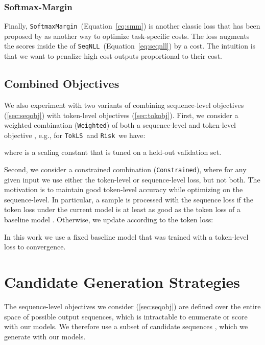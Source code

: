 \documentclass[11pt,a4paper]{article}
\newcommand{\TokLS}{\texttt{TokLS}}
\newcommand{\SeqNLL}{\texttt{SeqNLL}}
\newcommand{\Risk}{\texttt{Risk}}
\newcommand{\SoftmaxMargin}{\texttt{SoftmaxMargin}}
\newcommand{\Constrained}{\texttt{Constrained}}
\newcommand{\Weighted}{\texttt{Weighted}}
\begin{document}
\subsubsection*{Softmax-Margin}
\label{sec:smm}

Finally, \SoftmaxMargin~(Equation~\ref{eq:smm}) is another classic loss that has been proposed by \citet{gimpel+smith2010acl} as another way to optimize task-specific costs.
The loss augments the scores inside the  of \SeqNLL~(Equation~\ref{eq:seqnll}) by a cost.
The intuition is that we want to penalize high cost outputs proportional to their cost.



\subsection{Combined Objectives}
\label{sec:comb}

We also experiment with two variants of combining sequence-level objectives (\textsection\ref{sec:seqobj}) with token-level objectives (\textsection\ref{sec:tokobj}).
First, we consider a weighted combination (\Weighted) of both a sequence-level and token-level objective \citep{wu2016google}, e.g., for \TokLS~and \Risk~we have:

where  is a scaling constant that is tuned on a held-out validation set.

Second, we consider a constrained combination (\Constrained), where for any given input we use either the token-level or sequence-level loss, but not both.
The motivation is to maintain good token-level accuracy while optimizing on the sequence-level.
In particular, a sample is processed with the sequence loss if the token loss under the current model is at least as good as the token loss of a baseline model . Otherwise, we update according to the token loss:

In this work we use a fixed baseline model that was trained with a token-level loss to convergence.


\section{Candidate Generation Strategies}
\label{sec:candidategen}

The sequence-level objectives we consider (\textsection\ref{sec:seqobj}) are defined over the entire space of possible output sequences, which is intractable to enumerate or score with our models.
We therefore use a subset of  candidate sequences , which we generate with our models.
\end{document}
